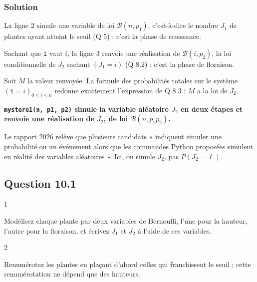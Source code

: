 \documentclass[11pt,a4paper]{article}
\begin{document}
\hypertarget{solution-19}{%
\subsubsection{Solution}\label{solution-19}}

La ligne 2 simule une variable de loi \(\mathcal B(n,p_1)\), c'est-à-dire le nombre \(J_1\) de plantes ayant atteint le seuil (Q 5) : c'est la phase de croissance.

Sachant que \texttt{i} vaut \(i\), la ligne 3 renvoie une réalisation de \(\mathcal B(i,p_2)\), la loi conditionnelle de \(J_2\) sachant \((J_1=i)\) (Q 8.2) : c'est la phase de floraison.

Soit \(M\) la valeur renvoyée. La formule des probabilités totales sur le système \((\texttt i=i)_{0\le i\le n}\) redonne exactement l'expression de Q 8.3 : \(M\) a la loi de \(J_2\).

\textbf{\texttt{mystere1(\allowbreak{}n,\allowbreak{}\ p1,\allowbreak{}\ p2)\allowbreak{}} simule la variable aléatoire \(J_2\) en deux étapes et renvoie une réalisation de \(J_2\), de loi \(\mathcal B(n,p_1p_2)\).}

\begin{piege}

Le rapport 2026 relève que plusieurs candidats « indiquent simuler une probabilité ou un événement alors que les commandes Python proposées simulent en réalité des variables aléatoires ». Ici, on simule \(J_2\), pas \(P(J_2=\ell)\).

\end{piege}

\hypertarget{question-10.1}{%
\subsection{Question 10.1}\label{question-10.1}}

\begin{indication}{1}

Modélisez chaque plante par deux variables de Bernoulli, l'une pour la hauteur, l'autre pour la floraison, et écrivez \(J_1\) et \(J_2\) à l'aide de ces variables.

\end{indication}

\begin{indication}{2}

Renumérotez les plantes en plaçant d'abord celles qui franchissent le seuil ; cette renumérotation ne dépend que des hauteurs.

\end{indication}
\end{document}
